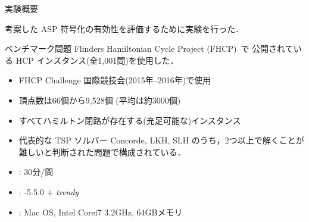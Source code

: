 \documentclass[dvipdfmx]{beamer}
\begin{document}
\begin{frame}{実験概要}
\begin{block}{}\centering
  考案した ASP 符号化の有効性を評価するために実験を行った．
\end{block}
\vfill

\begin{exampleblock}{ベンチマーク問題}
Flinders Hamiltonian Cycle Project (FHCP)~\footnotemark[2] で
公開されている HCP インスタンス(全1,001問)を使用した．
\begin{itemize}
\item FHCP Challenge 国際競技会(2015年--2016年)で使用
\item 頂点数は66個から9,528個 (平均は約3000個)
\item すべてハミルトン閉路が存在する(充足可能な)インスタンス
\item 代表的な TSP ソルバー \textsf{Concorde}, \textsf{LKH}, \textsf{SLH}
  のうち，2つ以上で解くことが難しいと判断された問題で構成されている．
\end{itemize}
\end{exampleblock}

\begin{itemize}
  \item {}: 30分/問
  \item {}: {\clingo}-5.5.0 $+$ \textit{trendy}
  \item {}: Mac OS, Intel Corei7 3.2GHz, 64GBメモリ
\end{itemize}
\end{frame}
\end{document}
